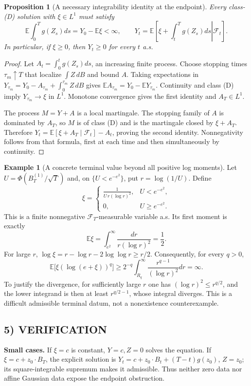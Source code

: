 \documentclass[11pt,a4paper]{article}
\newcommand{\E}{\mathbb E}
\newcommand{\F}{\mathcal F}
\newtheorem{proposition}[theorem]{Proposition}
\theoremstyle{definition}
\newtheorem{example}[theorem]{Example}
\begin{document}
\begin{proposition}[A necessary integrability identity at the endpoint]
Every class-(D) solution with $\xi\in L^1$ must satisfy
\[
 \E\int_0^Tg(Z_s)ds=Y_0-\E\xi<\infty,
 \qquad
 Y_t=\E\left[\left.\xi+\int_t^Tg(Z_s)ds\right|\F_t\right].
\]
In particular, if $\xi\ge0$, then $Y_t\ge0$ for every $t$ a.s.
\end{proposition}
\begin{proof}
Let $A_t=\int_0^tg(Z_s)ds$, an increasing finite process. Choose stopping times $\tau_m\uparrow T$ that localize $\int Z\,dB$ and bound $A$. Taking expectations in $Y_{\tau_m}=Y_0-A_{\tau_m}+\int_0^{\tau_m}Z\,dB$ gives
$\E A_{\tau_m}=Y_0-\E Y_{\tau_m}$. Continuity and class (D) imply $Y_{\tau_m}\to\xi$ in $L^1$. Monotone convergence gives the first identity and $A_T\in L^1$.

The process $M=Y+A$ is a local martingale. The stopping family of $A$ is dominated by $A_T$, so $M$ is of class (D) and is the martingale closed by $\xi+A_T$. Therefore $Y_t=\E[\xi+A_T\mid\F_t]-A_t$, proving the second identity. Nonnegativity follows from that formula, first at each time and then simultaneously by continuity.
\end{proof}

\begin{example}[A concrete terminal value beyond all positive log moments]
Let $U=\Phi(B_T^{(1)}/\sqrt T)$ and, on $\{U<e^{-e^2}\}$, put $r=\log(1/U)$. Define
\[
 \xi=\begin{cases}
 \displaystyle\frac1{U\,r(\log r)^2},&U<e^{-e^2},\\
 0,&U\ge e^{-e^2}.
 \end{cases}
\]
This is a finite nonnegative $\F_T$-measurable variable a.s. Its first moment is exactly
\[
 \E\xi=\int_{e^2}^\infty\frac{dr}{r(\log r)^2}=\frac12.
\]
For large $r$, $\log\xi=r-\log r-2\log\log r\ge r/2$. Consequently, for every $q>0$,
\[
 \E\bigl[\xi(\log(e+\xi))^q\bigr]
 \ge 2^{-q}\int_{R_q}^\infty\frac{r^{q-1}}{(\log r)^2}dr=\infty.
\]
To justify the divergence, for sufficiently large $r$ one has $(\log r)^2\le r^{q/2}$, and the lower integrand is then at least $r^{q/2-1}$, whose integral diverges. This is a difficult admissible terminal datum, not a nonexistence counterexample.
\end{example}

\subsection*{5) VERIFICATION}
\textbf{Small cases.} If $\xi=c$ is constant, $Y=c,Z=0$ solves the equation. If $\xi=c+z_0\cdot B_T$, the explicit solution is
$Y_t=c+z_0\cdot B_t+(T-t)g(z_0)$, $Z=z_0$; its square-integrable supremum makes it admissible. Thus neither zero data nor affine Gaussian data expose the endpoint obstruction.
\end{document}

